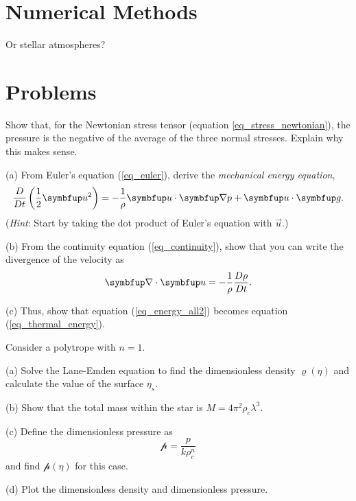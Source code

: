 %
% 

\section{Numerical Methods}

Or stellar atmospheres?



\section*{Problems}
%

\begin{problem}
\label{prob_pressure} 
Show that, for the Newtonian stress tensor (equation \ref{eq_stress_newtonian}), the pressure is the negative of the average of the three normal stresses.  Explain why this makes sense.
\end{problem}

\begin{problem}
\label{prob_energy_change} 

(a) From Euler's equation (\ref{eq_euler}), derive the \emph{mechanical energy equation},
\[
\frac{D}{Dt} \left( \frac{1}{2} \vec{u}^2 \right) = -\frac{1}{\rho} \vec{u} \cdot \grad p + \vec{u} \cdot \vec{g}.
\]
(\emph{Hint}: Start by taking the dot product of Euler's equation with $\vec{u}$.)

(b) From the continuity equation (\ref{eq_continuity}), show that you can write the divergence of the velocity as
\[
\grad \cdot \vec{u} = -\frac{1}{\rho} \frac{D\rho}{Dt}.
\]

(c) Thus, show that equation (\ref{eq_energy_all2}) becomes equation (\ref{eq_thermal_energy}).

\end{problem}


\begin{problem}[Polytropes]
\label{prob_lane_emden} 
Consider a polytrope with $n=1$.  

(a) Solve the Lane-Emden equation to find the dimensionless density $\varrho(\eta)$ and calculate the value of the surface $\eta_s$.

(b) Show that the total mass within the star is $M = 4\pi^2 \rho_c \lambda^3$.

(c) Define the dimensionless pressure as 
\[
\mathscr{p} = \frac{p}{k\rho_c^n}
\]
and find $\mathscr{p}(\eta)$ for this case.

(d) Plot the dimensionless density and dimensionless pressure.
\end{problem}




